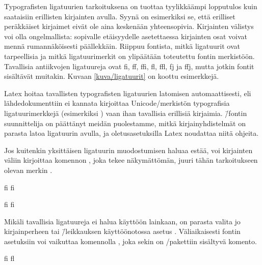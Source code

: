 Typografisten ligatuurien tarkoituksena on tuottaa tyylikkäämpi
lopputulos kuin saataisiin erillisten kirjainten avulla. Syynä on
esimerkiksi se, että erilliset peräkkäiset kirjaimet eivät ole aina
keskenään yhteensopivia. Kirjainten välistys voi olla ongelmallista:
sopivalle etäisyydelle asetettaessa kirjainten osat voivat mennä
rumannäköisesti päällekkäin. Riippuu fontista, mitkä ligatuurit ovat
tarpeellisia ja mitkä ligatuurimerkit on ylipäätään toteutettu fontin
merkistöön. Tavallisia antiikvojen ligatuureja ovat fi, ff, ffi, fl,
ffl, fj ja ffj, mutta jotkin fontit sisältävät muitakin. Kuvaan
\ref{kuva/ligatuurit} on koottu esimerkkejä.


Latex hoitaa tavallisten typografisten ligatuurien latomisen
automaattisesti, eli lähdedokumenttiin ei kannata kirjoittaa
Unicode\-/merkistön typografisia ligatuurimerkkejä (esimerkiksi
) vaan ihan tavallisia
erillisiä kirjaimia.  \=/fontin suunnittelija on
päättänyt meidän puolestamme, mitkä kirjainyhdistelmät on parasta latoa
ligatuurin avulla, ja oletusasetuksilla Latex noudattaa niitä ohjeita.

Jos kuitenkin yksittäisen ligatuurin muodostumisen haluaa estää, voi
kirjainten väliin kirjoittaa komennon , joka
tekee näkymättömän, juuri tähän tarkoitukseen olevan merkin
.

\begin{koodilohkosis}
fi f\textcompwordmark i
\end{koodilohkosis}

\begin{tulossis}
  fi f\textcompwordmark i
\end{tulossis}

\noindent
Mikäli tavallisia ligatuureja ei halua käyttöön lainkaan, on parasta
valita jo kirjainperheen tai \=/leikkauksen käyttöönotossa asetus
. Väliaikaisesti fontin asetuksiin
voi vaikuttaa komennolla , joka sekin on
\-/pakettiin sisältyvä komento.

\begin{koodilohkosis}
{ fi fl}
\end{koodilohkosis}

